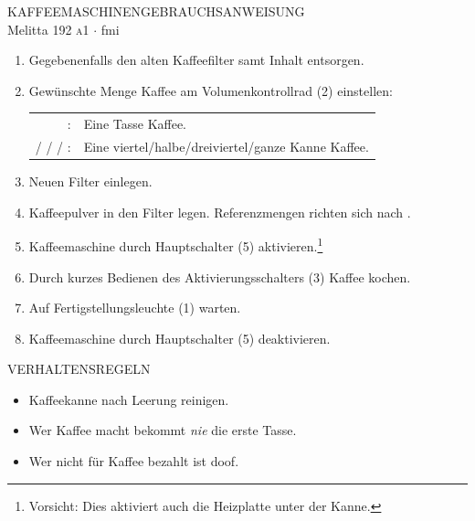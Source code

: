 \documentclass[a4paper,11pt]{article}
\newcommand\singlecup{%
    \begin{tikzpicture}[line width=0.17ex,scale=0.7]
        \draw (-1.35ex,0ex) to[out=-45,in=180] (-0.8ex,-0.3ex) -- (0.8ex,-0.3ex) to[out=0,in=-135] (1.35ex,0ex);
        \fill (-0.92ex,1.5ex) -- (-0.92ex,0.5ex) to[out=270,in=180] (-0.3ex,-0.3ex) -- (0.3ex,-0.3ex) to[out=0,in=270] (0.92ex,0.5ex) -- (0.92ex,1.5ex) node (tr) {};
        \draw ($(tr.center) + (0,-0.15ex)$) to[out=0,in=90] ++(0.39ex,-0.3ex) to[out=270,in=0] ++(-0.39ex,-0.3ex);
    \end{tikzpicture}
}
\newcommand{\coffeecup}{\smash{\raisebox{0.6ex}{\singlecup}\hspace{-0.95em}\singlecup}}
\newcommand{\kettle}[1]{
    \smash{
        \begin{tikzpicture}[line width=0.2ex,scale=0.6,baseline=-0.5ex]
            \draw[semithick] (-1.7ex,2.1ex) -- (-1.3ex,1.7ex) -- (-1.3ex,-1.2ex) to[out=270,in=180] (-1.0ex,-1.5ex) -- (1.2ex,-1.5ex) to[out=0,in=270] (1.5ex,-1.2ex) -- (1.5ex,2.1ex) -- (1.7ex,2.1ex) to[out=0,in=90] (2.0ex,1.8ex) -- (2.0ex,-0.5ex) to[out=270,in=0] (1.7ex,-0.8ex) -- (1.5ex,-0.8ex);
            \foreach \y in {1,...,#1} { \node[fill,inner sep=0,rounded corners=0.1ex,minimum width=1.32ex,minimum height=0.35ex] at (0.1ex,{0.8ex*\y-1.67ex}) {}; }
        \end{tikzpicture}
    }
}
\begin{document}
%
\begin{center}%
    KAFFEEMASCHINENGEBRAUCHSANWEISUNG\\
    Melitta 192 \textsc{a}1 $\cdot$ fmi
\end{center}
\begin{enumerate}[label={\textsc{schritt \arabic*:}},leftmargin=5.4em]
    \item Gegebenenfalls den alten Kaffeefilter samt Inhalt entsorgen.
    \item Gewünschte Menge Kaffee am Volumenkontrollrad (2) einstellen:

        \begin{tabular}{@{}rl@{}}
            \coffeecup:                          & Eine Tasse Kaffee.                                 \\
            \kettle1/\kettle2/\kettle3/\kettle4: & Eine viertel/halbe/dreiviertel/ganze Kanne Kaffee.
        \end{tabular}
    \item Neuen Filter einlegen.
    \item Kaffeepulver in den Filter legen.
        Referenzmengen richten sich nach .
    \item Kaffeemaschine durch Hauptschalter (5) aktivieren.\footnote{Vorsicht: Dies aktiviert auch die Heizplatte unter der Kanne.}
    \item Durch kurzes Bedienen des Aktivierungsschalters (3) Kaffee kochen.
    \item Auf Fertigstellungsleuchte (1) warten.
    \item Kaffeemaschine durch Hauptschalter (5) deaktivieren.
\end{enumerate}

\begin{center}
    VERHALTENSREGELN
\end{center}
\begin{itemize}[leftmargin=0em]
    \item Kaffeekanne nach Leerung reinigen.
    \item Wer Kaffee macht bekommt \emph{nie} die erste Tasse.
    \item Wer nicht für Kaffee bezahlt ist doof.
\end{itemize}

\vfill
\end{document}
